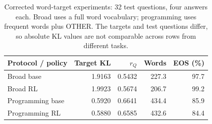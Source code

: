 \begin{table}[htbp]
\centering\small
\caption{Corrected word-target experiments: 32 test questions, four answers each. Broad uses a full word vocabulary; programming uses frequent words plus OTHER. The targets and test questions differ, so absolute KL values are not comparable across rows from different tasks.}\label{tab:corrected-new}
\begin{tabular}{@{}lrrrr@{}}
\toprule
Protocol / policy & Target KL & $r_Q$ & Words & EOS (\%)\\
\midrule
Broad base & 1.9163 & 0.5432 & 227.3 & 97.7\\
Broad RL & 1.9923 & 0.5674 & 206.7 & 99.2\\
Programming base & 0.5920 & 0.6641 & 434.4 & 85.9\\
Programming RL & 0.5880 & 0.6585 & 432.6 & 84.4\\
\bottomrule
\end{tabular}
\end{table}
